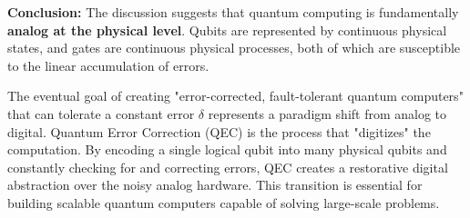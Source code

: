 \documentclass{article}
\begin{document}
\textbf{Conclusion:}
The discussion suggests that quantum computing is fundamentally \textbf{analog at the physical level}. Qubits are represented by continuous physical states, and gates are continuous physical processes, both of which are susceptible to the linear accumulation of errors.

The eventual goal of creating "error-corrected, fault-tolerant quantum computers" that can tolerate a constant error $\delta$ represents a paradigm shift from analog to digital. Quantum Error Correction (QEC) is the process that "digitizes" the computation. By encoding a single logical qubit into many physical qubits and constantly checking for and correcting errors, QEC creates a restorative digital abstraction over the noisy analog hardware. This transition is essential for building scalable quantum computers capable of solving large-scale problems.
\end{document}
